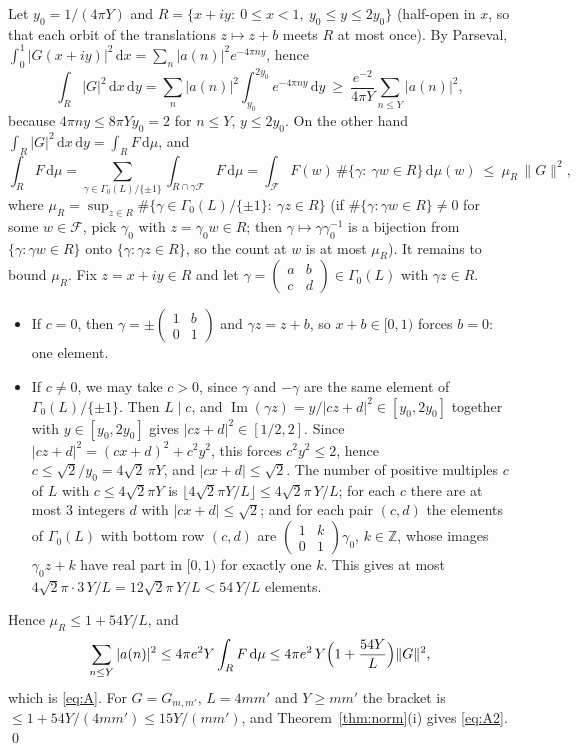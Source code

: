 ﻿\documentclass[11pt]{amsart}
\theoremstyle{remark}
\newcommand{\Z}{\mathbb{Z}}
\newcommand{\cF}{\mathcal{F}}
\newcommand{\dd}{\mathrm{d}}
\begin{document}
Let $y_0=1/(4\pi Y)$ and $R=\{x+iy:\ 0\le x<1,\ y_0\le y\le2y_0\}$ (half-open in $x$, so that each orbit of the translations $z\mapsto z+b$ meets $R$ at most once). By Parseval, $\int_0^1|G(x+iy)|^2\,\dd x=\sum_n|a(n)|^2e^{-4\pi ny}$, hence
\[
\int_R|G|^2\,\dd x\,\dd y=\sum_n|a(n)|^2\int_{y_0}^{2y_0}e^{-4\pi ny}\,\dd y\ \ge\ \frac{e^{-2}}{4\pi Y}\sum_{n\le Y}|a(n)|^2 ,
\]
because $4\pi ny\le 8\pi Yy_0=2$ for $n\le Y$, $y\le2y_0$. On the other hand $\int_R|G|^2\,\dd x\,\dd y=\int_RF\,\dd\mu$, and
\[
\int_RF\,\dd\mu=\sum_{\gamma\in\Gamma_0(L)/\{\pm1\}}\int_{R\cap\gamma\cF}F\,\dd\mu=\int_{\cF}F(w)\,\#\{\gamma:\ \gamma w\in R\}\,\dd\mu(w)\ \le\ \mu_R\,\|G\|^2,
\]
where $\mu_R=\sup_{z\in R}\#\{\gamma\in\Gamma_0(L)/\{\pm1\}:\ \gamma z\in R\}$ (if $\#\{\gamma:\gamma w\in R\}\ne0$ for some $w\in\cF$, pick $\gamma_0$ with $z=\gamma_0w\in R$; then $\gamma\mapsto\gamma\gamma_0^{-1}$ is a bijection from $\{\gamma:\gamma w\in R\}$ onto $\{\gamma:\gamma z\in R\}$, so the count at $w$ is at most $\mu_R$). It remains to bound $\mu_R$. Fix $z=x+iy\in R$ and let $\gamma=\left(\begin{smallmatrix}a&b\\ c&d\end{smallmatrix}\right)\in\Gamma_0(L)$ with $\gamma z\in R$.
\begin{itemize}[leftmargin=2em]
\item If $c=0$, then $\gamma=\pm\left(\begin{smallmatrix}1&b\\ 0&1\end{smallmatrix}\right)$ and $\gamma z=z+b$, so $x+b\in[0,1)$ forces $b=0$: one element.
\item If $c\ne0$, we may take $c>0$, since $\gamma$ and $-\gamma$ are the same element of $\Gamma_0(L)/\{\pm1\}$. Then $L\mid c$, and $\operatorname{Im}(\gamma z)=y/|cz+d|^2\in[y_0,2y_0]$ together with $y\in[y_0,2y_0]$ gives $|cz+d|^2\in[1/2,2]$. Since $|cz+d|^2=(cx+d)^2+c^2y^2$, this forces $c^2y^2\le2$, hence $c\le\sqrt2/y_0=4\sqrt2\,\pi Y$, and $|cx+d|\le\sqrt2$. The number of positive multiples $c$ of $L$ with $c\le4\sqrt2\pi Y$ is $\lfloor4\sqrt2\pi Y/L\rfloor\le4\sqrt2\pi\,Y/L$; for each $c$ there are at most $3$ integers $d$ with $|cx+d|\le\sqrt2$; and for each pair $(c,d)$ the elements of $\Gamma_0(L)$ with bottom row $(c,d)$ are $\left(\begin{smallmatrix}1&k\\ 0&1\end{smallmatrix}\right)\gamma_0$, $k\in\Z$, whose images $\gamma_0z+k$ have real part in $[0,1)$ for exactly one $k$. This gives at most $4\sqrt2\pi\cdot3\,Y/L=12\sqrt2\pi\,Y/L<54\,Y/L$ elements.
\end{itemize}
Hence $\mu_R\le1+54Y/L$, and
\[
\sum_{n\le Y}|a(n)|^2\le 4\pi e^2Y\int_RF\,\dd\mu\le 4\pi e^2\,Y\Bigl(1+\frac{54Y}L\Bigr)\|G\|^2,
\]
which is \eqref{eq:A}. For $G=G_{m,m'}$, $L=4mm'$ and $Y\ge mm'$ the bracket is $\le 1+54Y/(4mm')\le 15Y/(mm')$, and Theorem~\ref{thm:norm}(i) gives \eqref{eq:A2}. \qed
\end{document}
